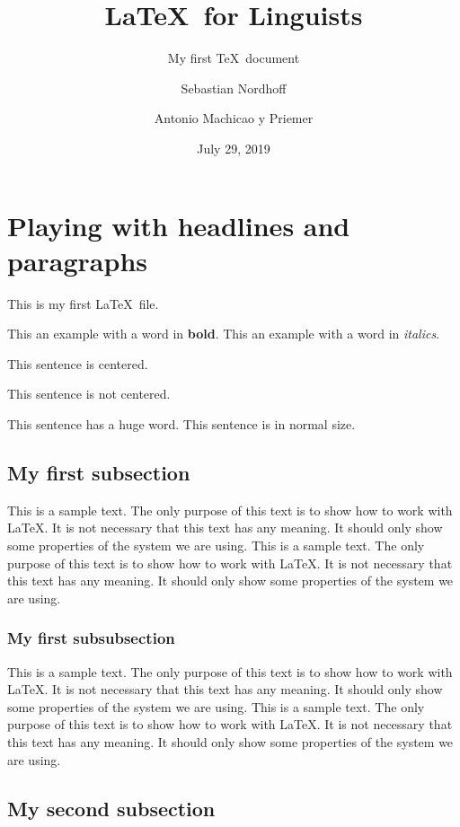 \documentclass[10pt, paper=a4, abstracton]{scrartcl}
\author{Sebastian Nordhoff \and Antonio Machicao y Priemer}
\title{\LaTeX\ for Linguists}
\subtitle{My first \TeX\ document}
\date{July 29, 2019}
\begin{document}
\maketitle

\tableofcontents


\section[Headlines and paragraphs]{Playing with headlines and paragraphs}

This is my first \LaTeX\ file. 

This an example with a word in \textbf{bold}. This an example with a word in \textit{italics}.

\begin{center}
	This sentence is centered.
\end{center}

This sentence is not centered. 

This sentence has a {\Huge huge} word. This sentence is in normal size.


\subsection[First subsection]{My first subsection}

This is a sample text. The only purpose of this text is to show how to work with \LaTeX . It is not necessary that this text has any meaning. It should only show some properties of the system we are using. This is a sample text. The only purpose of this text is to show how to work with \LaTeX . It is not necessary that this text has any meaning. It should only show some properties of the system we are using. 


\subsubsection[First subsubsection]{My first subsubsection}

This is a sample text. The only purpose of this text is to show how to work with \LaTeX . It is not necessary that this text has any meaning. It should only show some properties of the system we are using. This is a sample text. The only purpose of this text is to show how to work with \LaTeX . It is not necessary that this text has any meaning. It should only show some properties of the system we are using. 


\subsection[Second subsection]{My second subsection}
\end{document}
